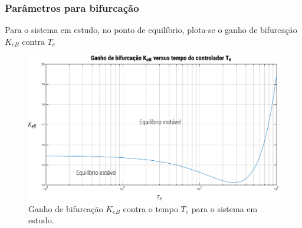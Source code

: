 \documentclass[10pt, compress,xcolor={svgnames,dvipsnames,x11names}]{beamer}
\begin{document}
\begin{frame}%
\frametitle{Parâmetros para bifurcação}
\scriptsize

	Para o sistema em estudo, no ponto de equilíbrio, plota-se o ganho de bifurcação $K_{eB}$ contra $T_e$

\begin{figure}[htb]
	\begin{center}
	    \includegraphics[width = 0.9\columnwidth]{../images/presentation/relacaoKeTe.pdf}
	\end{center}
	\caption{\label{fig::relacaoKeTe} Ganho de bifurcação $K_{eB}$ contra o tempo $T_e$ para o sistema em estudo.}
\end{figure}

\normalsize
\end{frame}%
\end{document}
